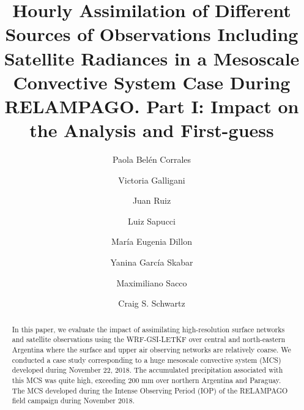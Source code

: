 \documentclass[final,5p,times,twocolumn,authoryear]{elsarticle} %
\begin{document}
\begin{frontmatter}

  \title{Hourly Assimilation of Different Sources of Observations Including Satellite Radiances in a Mesoscale Convective System Case During RELAMPAGO. Part I: Impact on the Analysis and First-guess}
    \author[UBA,CIMA,CNRS]{Paola Belén Corrales}
    \author[UBA,CIMA,CNRS]{Victoria Galligani}
  
    \author[UBA,CIMA,CNRS]{Juan Ruiz}
  
    \author[INPE]{Luiz Sapucci}
  
    \author[SMN,CONICET]{María Eugenia Dillon}
  
    \author[SMN,CONICET,CNRS]{Yanina García Skabar}
  
    \author[SMN]{Maximiliano Sacco}
  
    \author[NCAR]{Craig S. Schwartz}
  
      \address[UBA]{Universidad de Buenos Aires, Facultad de Ciencias Exactas y Naturales, Departamento de Ciencias de la Atmósfera y los Océanos. Buenos Aires, Argentina.}
    \address[CIMA]{CONICET -- Universidad de Buenos Aires. Centro de Investigaciones del Mar y la Atmósfera (CIMA). Buenos Aires, Argentina.}
    \address[CNRS]{CNRS -- IRD -- CONICET -- UBA. Instituto Franco-Argentino para el Estudio del Clima y sus Impactos (IRL 3351 IFAECI). Buenos Aires, Argentina.}
    \address[SMN]{Servicio Meteorológico Nacional de Argentina.}
    \address[CONICET]{CONICET (Consejo Nacional de Investigaciones Científicas y Técnicas).}
    \address[INPE]{National Institute for Space Research, Brazil, Center for Weather Forecasting and Climate Studies.}
    \address[NCAR]{National Center for Atmospheric Research, Boulder, Colorado.}
  
  \begin{abstract}
  In this paper, we evaluate the impact of assimilating high-resolution surface networks and satellite observations using the WRF-GSI-LETKF over central and north-eastern Argentina where the surface and upper air observing networks are relatively coarse. We conducted a case study corresponding to a huge mesoscale convective system (MCS) developed during November 22, 2018. The accumulated precipitation associated with this MCS was quite high, exceeding 200 mm over northern Argentina and Paraguay. The MCS developed during the Intense Observing Period (IOP) of the RELAMPAGO field campaign during November 2018.
  

\end{abstract}
\end{frontmatter}
\end{document}
